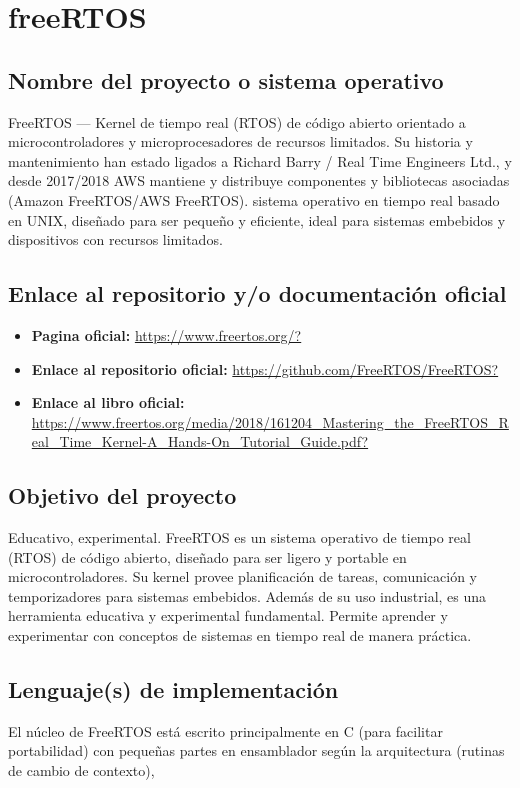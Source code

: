 \section{freeRTOS}

\subsection{Nombre del proyecto o sistema operativo}
FreeRTOS — Kernel de tiempo real (RTOS) de código abierto orientado a microcontroladores y microprocesadores de recursos limitados. Su historia y mantenimiento han estado ligados a Richard Barry / Real Time Engineers Ltd., y desde 2017/2018 AWS mantiene y distribuye componentes y bibliotecas asociadas (Amazon FreeRTOS/AWS FreeRTOS). \citep{wikipedia-FreeRTOS}
sistema operativo en tiempo real basado en UNIX, diseñado para ser pequeño y eficiente, ideal para sistemas embebidos y dispositivos con recursos limitados.
\subsection{Enlace al repositorio y/o documentación oficial}
\begin{itemize}
    \item \textbf{Pagina oficial:} \url{https://www.freertos.org/?}
    \item \textbf{Enlace al repositorio oficial:} \url{https://github.com/FreeRTOS/FreeRTOS?}
    \item \textbf{Enlace al libro oficial:} \url{https://www.freertos.org/media/2018/161204_Mastering_the_FreeRTOS_Real_Time_Kernel-A_Hands-On_Tutorial_Guide.pdf?}
\end{itemize}

\subsection{Objetivo del proyecto }
Educativo, experimental.
FreeRTOS es un sistema operativo de tiempo real (RTOS) de código abierto, diseñado para ser ligero y portable en microcontroladores. Su kernel provee planificación de tareas, comunicación y temporizadores para sistemas embebidos. Además de su uso industrial, es una herramienta educativa y experimental fundamental. Permite aprender y experimentar con conceptos de sistemas en tiempo real de manera práctica.
\citep[pag. 19]{freertos_teaching}

\subsection{Lenguaje(s) de implementación}
El núcleo de FreeRTOS está escrito principalmente en C (para facilitar portabilidad) con pequeñas partes en ensamblador según la arquitectura (rutinas de cambio de contexto)\citep{wikipedia-FreeRTOS}, 

